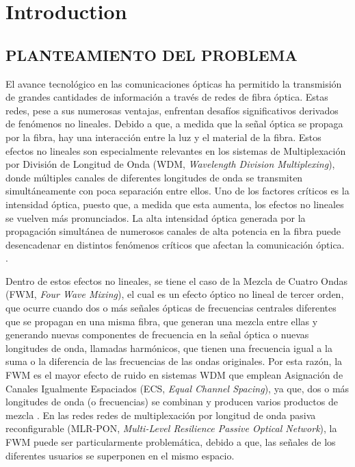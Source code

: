 \setcounter{page}{1}

\chapter{Introduction}
\label{chap1:introduction}

\begin{center}
    \item \section{PLANTEAMIENTO DEL PROBLEMA}
\end{center}


\justify %
\vfill %


El avance tecnológico en las comunicaciones ópticas ha permitido la transmisión de grandes cantidades de información a través de redes de fibra óptica. Estas redes, pese a sus numerosas ventajas, enfrentan desafíos significativos derivados de fenómenos no lineales. Debido a que, a medida que la señal óptica se propaga por la fibra, hay una interacción entre la luz y el material de la fibra. Estos efectos no lineales son especialmente relevantes en los sistemas de Multiplexación por División de Longitud de Onda (WDM, \textit{Wavelength Division Multiplexing}), donde múltiples canales de diferentes longitudes de onda se transmiten simultáneamente con poca separación entre ellos. Uno de los factores críticos es la intensidad óptica, puesto que, a medida que esta aumenta, los efectos no lineales se vuelven más pronunciados. La alta intensidad óptica generada por la propagación simultánea de numerosos canales de alta potencia en la fibra puede desencadenar en distintos fenómenos críticos que afectan la comunicación óptica. \cite{Toulouse} \cite{Sing}.

Dentro de estos efectos no lineales, se tiene el caso de la Mezcla de Cuatro Ondas (FWM, \textit{Four Wave Mixing}), el cual es un efecto óptico no lineal de tercer orden, que ocurre cuando dos o más señales ópticas de frecuencias centrales diferentes que se propagan en una misma fibra, que generan una mezcla entre ellas y generando nuevas componentes de frecuencia en la señal óptica o nuevas longitudes de onda, llamadas harmónicos, que tienen una frecuencia igual a la suma o la diferencia de las frecuencias de las ondas originales. Por esta razón, la FWM es el mayor efecto de ruido en sistemas WDM que emplean Asignación de Canales Igualmente Espaciados (ECS, \textit{Equal Channel Spacing}), ya que, dos o más longitudes de onda (o frecuencias) se combinan y producen varios productos de mezcla \cite{Bansal}. En las redes redes de multiplexación por longitud de onda pasiva reconfigurable (MLR-PON, \textit{Multi-Level Resilience Passive Optical Network}), la FWM puede ser particularmente problemática, debido a que, las señales de los diferentes usuarios se superponen en el mismo espacio.

